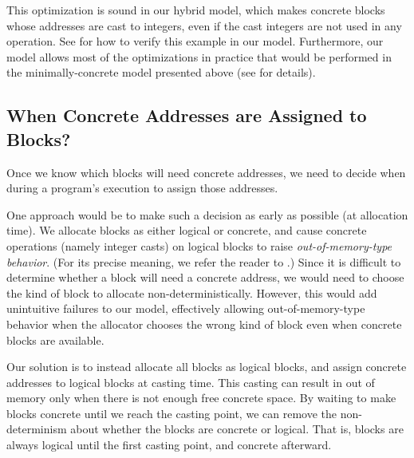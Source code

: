 This optimization is sound in our hybrid model, which makes concrete blocks whose addresses are cast
to integers, even if the cast integers are not used in any operation.  See
 for how to verify this example in our model.
Furthermore, our model allows most of the optimizations in practice that would be performed in the
minimally-concrete model presented above (see  for
details).


\subsection{When Concrete Addresses are Assigned to Blocks?}
\label{sec:intptrcast:formal-semantics:ownership}

Once we know which blocks will need concrete addresses, we need to
decide when during a program's execution to assign those addresses.

One approach would be to make such a decision as early as possible (\ie at allocation time). We
allocate blocks as either logical or concrete, and cause concrete operations (namely integer casts)
on logical blocks to raise \emph{out-of-memory-type behavior}.  (For its precise meaning, we refer
the reader to .)  Since it is difficult to determine
whether a block will need a concrete address,
we would need to choose the kind of block to allocate
non-deterministically. However, this would add unintuitive failures to
our model, effectively allowing out-of-memory-type behavior when the
allocator chooses the wrong kind of block even when concrete blocks
are available.

Our solution is to instead allocate all blocks as logical blocks, and assign concrete addresses to logical blocks at casting time. This casting can result in out of memory only when there is not enough free concrete space. By waiting to make blocks concrete until we reach the casting point,
we can remove the non-determinism about whether the blocks are
concrete or logical. That is, blocks are always logical until the
first casting point, and concrete afterward.

